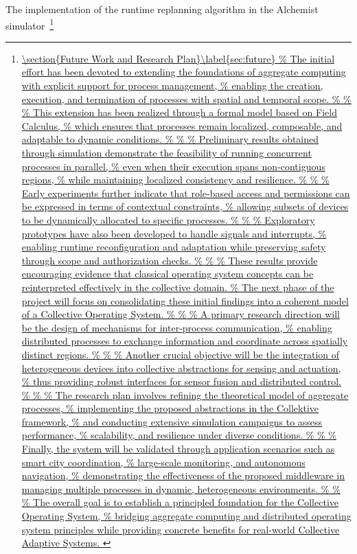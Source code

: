 \documentclass[runningheads]{llncs}
\begin{document}
    The implementation of the runtime replanning algorithm in the Alchemist simulator~\footnote{\url{

    \section{Future Work and Research Plan}\label{sec:future}





}}
\end{document}
